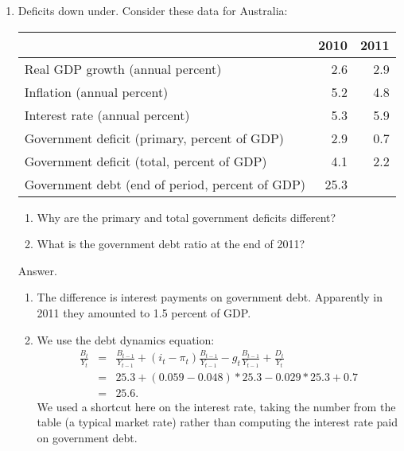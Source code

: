 \setlength{\leftmargini}{.5\oldleftmargini}
\begin{enumerate}
\item Deficits down under.
Consider these data for Australia:
%
\begin{center}
\begin{tabular}{lrr}
\toprule
        & 2010 & 2011 \\
\midrule
Real GDP growth (annual percent) & 2.6 & 2.9 \\
Inflation  (annual percent)      & 5.2 & 4.8 \\
Interest rate  (annual percent)  & 5.3 & 5.9 \\
Government deficit (primary, percent of GDP)    & 2.9 & 0.7 \\
Government deficit (total, percent of GDP)      & 4.1 & 2.2 \\
Government debt (end of period, percent of GDP) & 25.3 \\
\bottomrule
\end{tabular}
\end{center}
\begin{enumerate}
\item Why are the primary and total government deficits different?
\item What is the government debt ratio at the end of 2011?
\end{enumerate}

Answer.
\begin{enumerate}
\item The difference is interest payments on government debt.
Apparently in 2011 they amounted to 1.5 percent of GDP.
\item We use the debt dynamics equation:
\begin{eqnarray*}
    \frac{B_{t}}{Y_t}
            &=&
                \frac{B_{t-1}}{Y_{t-1}} + (i_t-\pi_t) \frac{B_{t-1}}{Y_{t-1}}
                - g_t \frac{B_{t-1}}{Y_{t-1}}
                +  \frac{D_{t}}{Y_{t}}  \\
             &=& 25.3 + (0.059-0.048)*25.3 - 0.029*25.3 + 0.7 \\
             &=&  25.6 .
\end{eqnarray*}
We used a shortcut here on the interest rate, taking the number
from the table (a typical market rate) rather than computing
the interest rate paid on government debt.
\end{enumerate}



\end{enumerate}
